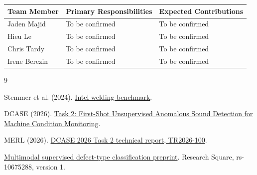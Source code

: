 \documentclass[11pt]{article}
\begin{document}
\begin{center}
\begin{tabularx}{\textwidth}{l X X}
    \toprule
    \textbf{Team Member} & \textbf{Primary Responsibilities} & \textbf{Expected Contributions} \\
    \midrule
    Jaden Majid & To be confirmed & To be confirmed \\
    Hieu Le & To be confirmed & To be confirmed \\
    Chris Tardy & To be confirmed & To be confirmed \\
    Irene Berezin & To be confirmed & To be confirmed \\
    \bottomrule
\end{tabularx}
\end{center}

\clearpage
\begin{thebibliography}{9}

Stemmer et al. (2024).
\href{https://arxiv.org/abs/2409.02290v1}{Intel welding benchmark}.

DCASE (2026).
\href{https://dcase.community/challenge2026/task-first-shot-unsupervised-anomalous-sound-detection-for-machine-condition-monitoring}{Task 2: First-Shot Unsupervised Anomalous Sound Detection for Machine Condition Monitoring}.

MERL (2026).
\href{https://shadow.merl.com/publications/TR2026-100}{DCASE 2026 Task 2 technical report, TR2026-100}.

\href{https://www.researchsquare.com/article/rs-10675288/v1?redirect=/article/rs-10675288}{Multimodal supervised defect-type classification preprint}.
Research Square, rs-10675288, version 1.

\end{thebibliography}
\end{document}
